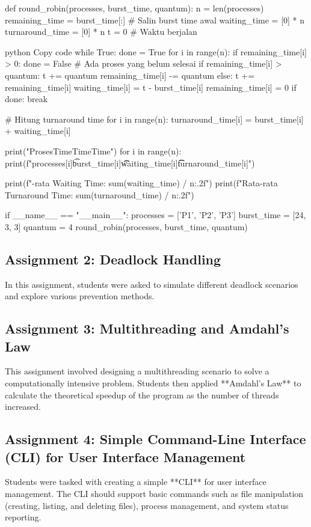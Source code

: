 \documentclass[12pt]{article}
\begin{document}
\begin{python} def round_robin(processes, burst_time, quantum): n = len(processes) remaining_time = burst_time[:] # Salin burst time awal waiting_time = [0] * n turnaround_time = [0] * n t = 0 # Waktu berjalan

python
Copy code
    while True:
        done = True
        for i in range(n):
            if remaining_time[i] > 0:
                done = False  # Ada proses yang belum selesai
                if remaining_time[i] > quantum:
                    t += quantum
                    remaining_time[i] -= quantum
                else:
                    t += remaining_time[i]
                    waiting_time[i] = t - burst_time[i]
                    remaining_time[i] = 0
        if done:
            break

    # Hitung turnaround time
    for i in range(n):
        turnaround_time[i] = burst_time[i] + waiting_time[i]

    print("Proses\tBurst Time\tWaiting Time\tTurnaround Time")
    for i in range(n):
        print(f"{processes[i]}\t{burst_time[i]}\t\t{waiting_time[i]}\t\t{turnaround_time[i]}")

    print(f"\nRata-rata Waiting Time: {sum(waiting_time) / n:.2f}")
    print(f"Rata-rata Turnaround Time: {sum(turnaround_time) / n:.2f}")

if __name__ == "__main__":
    processes = ['P1', 'P2', 'P3']
    burst_time = [24, 3, 3]
    quantum = 4
    round_robin(processes, burst_time, quantum)
\end{python}

\subsection{Assignment 2: Deadlock Handling}
In this assignment, students were asked to simulate different deadlock scenarios and explore various prevention methods.

\subsection{Assignment 3: Multithreading and Amdahl's Law}
This assignment involved designing a multithreading scenario to solve a computationally intensive problem. Students then applied **Amdahl's Law** to calculate the theoretical speedup of the program as the number of threads increased.

\subsection{Assignment 4: Simple Command-Line Interface (CLI) for User Interface Management}
Students were tasked with creating a simple **CLI** for user interface management. The CLI should support basic commands such as file manipulation (creating, listing, and deleting files), process management, and system status reporting.
\end{document}
